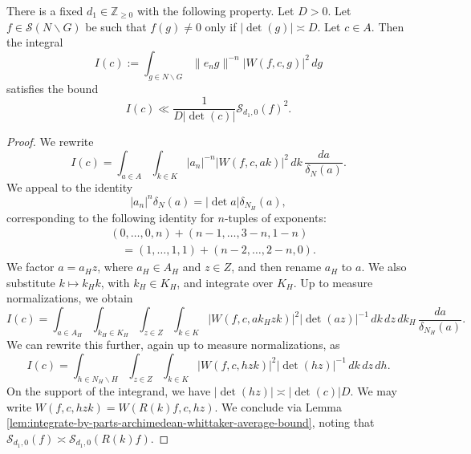 \begin{lemma}\label{lem:sub-gln:let-f-in-1}
  There is a fixed $d_1 \in \mathbb{Z}_{\geq 0}$ with the following property.  Let $D > 0$.  Let $f \in \mathcal{S}(N \backslash G)$ be such that $f(g) \neq 0$ only if $|\det(g)| \asymp D$.  Let $c \in A$.  Then the integral
  \begin{equation*}
    I(c) :=
    \int_{g \in N \backslash G}
    \|e_n g\|^{-n}
    |W(f, c, g)|^2  \, d g
  \end{equation*}
  satisfies the bound
  \begin{equation}\label{eq:ic-ll-detc}
    I(c) \ll \frac{1}{D |\det(c)|} \mathcal{S}_{d_1,0}(f)^2.
  \end{equation}
\end{lemma}
\begin{proof}
  We rewrite
  \begin{equation*}
    I(c) =
    \int_{a \in A}
    \int_{k \in K}
    |a_n|^{-n}
    |W(f, c, a k)|^2 \, d k \, \frac{d a}{\delta_N(a)}.
  \end{equation*}
  We appeal to the identity
  \begin{equation*}
    |a_n|^n \delta_N(a) = |\det a| \delta_{N_H}(a),
  \end{equation*}
  corresponding to the following identity for $n$-tuples of exponents:
  \begin{align*}
    &\left( 0, \dotsc, 0, n \right) + \left( n-1, \dotsc, 3-n, 1 - n \right) \\
    &\quad =
      \left( 1, \dotsc, 1, 1 \right)
      +
      \left( n-2, \dotsc, 2-n, 0 \right).
  \end{align*}
  We factor $a = a_H z$, where $a_H \in A_H$ and $z \in Z$, and then rename $a_H$ to $a$.  We also substitute $k \mapsto k_H k$, with $k_H \in K_H$, and integrate over $K_H$.  Up to measure normalizations, we obtain
  \begin{equation*}
    I(c) =
    \int_{a \in A_H}
    \int_{k_H \in K_H}
    \int_{z \in Z}
    \int_{k \in K}
    |W(f, c, a k_H z k)|^2
    |\det(a z)|^{-1}
    \, d k \, d z \, d k_H \, \frac{d a}{\delta_{N_H}(a)}.
  \end{equation*}
  We can rewrite this further, again up to measure normalizations, as
  \begin{equation*}
    I(c) =
    \int_{h \in N_H \backslash H}
    \int_{z \in Z}
    \int_{k \in K}
    |W(f, c, h z k)|^2
    |\det(h z)|^{-1}
    \, d k \, d z \, d h.
  \end{equation*}
  On the support of the integrand, we have $|\det(h z)| \asymp |\det(c)| D$.  We may write $W(f,c,h z k) = W(R(k) f,c,h z)$.  We conclude via Lemma \ref{lem:integrate-by-parts-archimedean-whittaker-average-bound}, noting that $\mathcal{S}_{d_1,0}(f) \asymp \mathcal{S}_{d_1,0}(R(k) f)$.
\end{proof}


